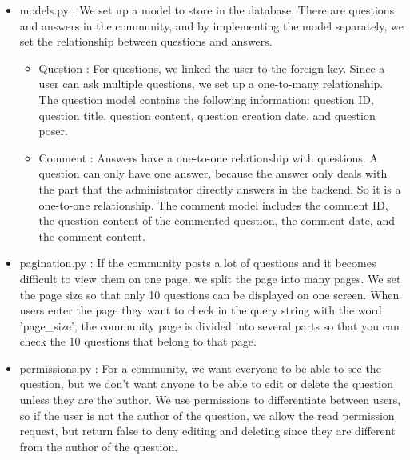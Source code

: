 \documentclass[conference, a4paper]{IEEEtran}
\begin{document}
\begin{enumerate}
\begin{itemize}
\begin{itemize}
        \item models.py : We set up a model to store in the database. There are questions and answers in the community, and by implementing the model separately, we set the relationship between questions and answers.
        \begin{itemize}
            \item Question : For questions, we linked the user to the foreign key. Since a user can ask multiple questions, we set up a one-to-many relationship. The question model contains the following information: question ID, question title, question content, question creation date, and question poser. \\
            \item Comment : Answers have a one-to-one relationship with questions. A question can only have one answer, because the answer only deals with the part that the administrator directly answers in the backend. So it is a one-to-one relationship. The comment model includes the comment ID, the question content of the commented question, the comment date, and the comment content.
        \end{itemize}

        \item pagination.py : If the community posts a lot of questions and it becomes difficult to view them on one page, we split the page into many pages. We set the page size so that only 10 questions can be displayed on one screen. When users enter the page they want to check in the query string with the word 'page\_size', the community page is divided into several parts so that you can check the 10 questions that belong to that page. \\
        
        \item permissions.py : For a community, we want everyone to be able to see the question, but we don't want anyone to be able to edit or delete the question unless they are the author. We use permissions to differentiate between users, so if the user is not the author of the question, we allow the read permission request, but return false to deny editing and deleting since they are different from the author of the question. \\


\end{itemize}
\end{itemize}
\end{enumerate}
\end{document}
